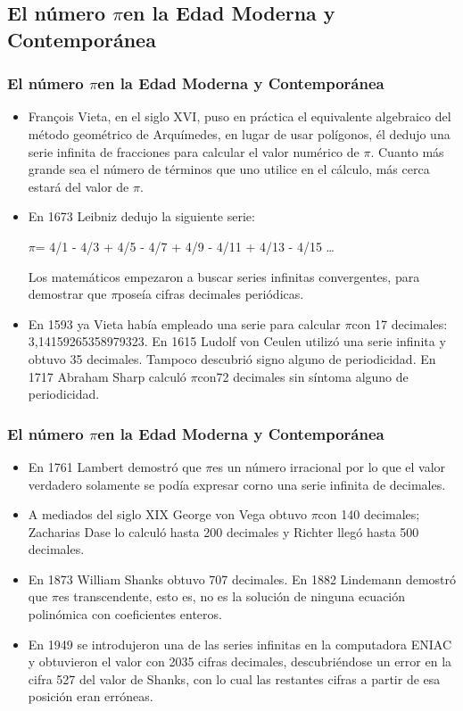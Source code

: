 \documentclass{beamer}
\newcommand{\PI}{{$\pi$}}
\begin{document}
\subsection{El número \PI en la Edad Moderna y Contemporánea}
\begin{frame}
\frametitle{El número \PI en la Edad Moderna y Contemporánea}

\begin{itemize}
\item François Vieta, en el siglo XVI, puso en práctica el equivalente algebraico del método geométrico de Arquímedes, en lugar de usar polígonos, él dedujo una serie infinita de fracciones para calcular el valor numérico de \PI. Cuanto más grande sea el número de términos que uno utilice en el cálculo, más cerca estará del valor de \PI.

\item En 1673 Leibniz dedujo la siguiente serie:

\centerline{\PI = 4/1 - 4/3 + 4/5 - 4/7 + 4/9 - 4/11 + 4/13 - 4/15 \dots}

Los matemáticos empezaron a buscar series infinitas convergentes, para demostrar que \PI poseía cifras decimales periódicas.

\item En 1593 ya Vieta había empleado una serie para calcular \PI con 17 decimales: 3,14159265358979323. En 1615 Ludolf von Ceulen utilizó una serie infinita y obtuvo 35 decimales. Tampoco descubrió signo alguno de periodicidad. En 1717 Abraham Sharp calculó \PI con72 decimales sin síntoma alguno de periodicidad.
\end{itemize}
\end{frame}

\begin{frame}
\frametitle{El número \PI en la Edad Moderna y Contemporánea}

\begin{itemize}
\item En 1761 Lambert demostró que \PI es un número irracional por lo que el valor verdadero solamente se podía expresar corno una serie infinita de decimales.

\item A mediados del siglo XIX George von Vega obtuvo \PI con 140 decimales; Zacharias Dase lo calculó hasta 200 decimales y Richter llegó hasta 500 decimales.

\item En 1873 William Shanks obtuvo 707 decimales. En 1882 Lindemann demostró que \PI es transcendente, esto es, no es la solución de ninguna ecuación polinómica con coeficientes enteros.

\item En 1949 se introdujeron una de las series infinitas en la computadora ENIAC y obtuvieron el valor con 2035 cifras decimales, descubriéndose un error en la cifra 527 del valor de Shanks, con lo cual las restantes cifras a partir de esa posición eran erróneas.
\end{itemize}
\end{frame}
\end{document}
